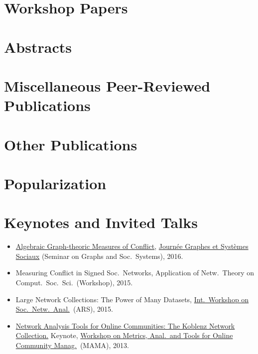 \documentclass[line,mm]{res}
\newcounter{x}
\newcounter{y}
\newcommand{\talknumber}{T\arabic{y}\stepcounter{y}}
\begin{document}
\begin{resume}
\section{Workshop Papers}    
\section{Abstracts}          
\section{Miscellaneous Peer-Reviewed Publications}	
\section{Other Publications} 
\section{Popularization}     

\section{Keynotes and Invited Talks}
\begin{itemize}
\item[{[\talknumber]}] 
  \href{https://www.slideshare.net/kunegis/algebraic-graphtheoretic-measures-of-conflict}{Algebraic Graph-theoric Measures of Conflict}, 
  \href{http://jgss.sciencesconf.org/}{Journée Graphes et Systèmes
    Sociaux} (Seminar on Graphs and Soc.\ Systems), 2016.  
\item[{[\talknumber]}] Measuring Conflict in Signed Soc.\ Networks, 
  Application of Netw.\ Theory on Comput.\ Soc.\ Sci.\ (Workshop), 2015.
\item[{[\talknumber]}] Large Network Collections:  The Power of Many Datasets,
  \href{http://www.ars15.unisa.it/}{Int.\ Workshop on Soc.\ Netw.\ Anal.}\ (ARS), 2015. 
\item[{[\talknumber]}] 
  \href{https://github.com/kunegis/pdfs/blob/master/kunegis:konect-mama.presentation.pdf}{Network
    Analysis Tools for Online Communities: The Koblenz Network 
    Collection.} Keynote, \href{http://mama.west.uni-koblenz.de/}{Workshop
    on Metrics, Anal.\ and Tools for Online Community Manag.}\ (MAMA), 2013.  
\end{itemize}


\end{resume}
\end{document}
